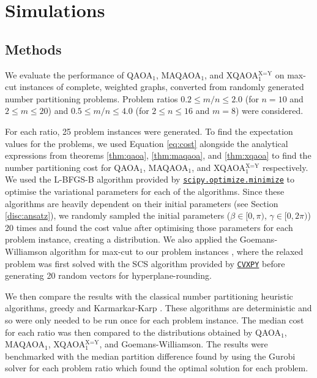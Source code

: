 \section{Simulations} \label{sec:sim}
\subsection{Methods}
We evaluate the performance of QAOA$_1$, MAQAOA$_1$, and XQAOA$_1^{\text{X=Y}}$ on max-cut instances of complete, weighted graphs, converted from randomly generated number partitioning problems. Problem ratios $0.2\leq m/n\leq 2.0$ (for $n=10$ and $2\leq m\leq 20$) and $0.5\leq m/n\leq 4.0$ (for $2\leq n\leq 16$ and $m=8$) were considered. 

For each ratio, 25 problem instances were generated. To find the expectation values for the problems, we used Equation \ref{eq:cost} alongside the analytical expressions from theorems \ref{thm:qaoa}, \ref{thm:maqaoa}, and \ref{thm:xqaoa} to find the number partitioning cost for QAOA$_1$, MAQAOA$_1$, and XQAOA$_1^{\text{X=Y}}$ respectively. We used the L-BFGS-B algorithm provided by \href{https://docs.scipy.org/doc/scipy/reference/optimize.minimize-lbfgsb.html}{\texttt{scipy.optimize.minimize}} to optimise the variational parameters for each of the algorithms. Since these algorithms are heavily dependent on their initial parameters (see Section \ref{disc:ansatz}), we randomly sampled the initial parameters ($\beta\in[0,\pi)$, $\gamma\in[0,2\pi)$) 20 times and found the cost value after optimising those parameters for each problem instance, creating a distribution. We also applied the Goemans-Williamson algorithm for max-cut to our problem instances \cite{goemans1994879}, where the relaxed problem was first solved with the SCS algorithm provided by \href{https://www.cvxpy.org/tutorial/advanced/index.html}{\texttt{CVXPY}} before generating 20 random vectors for hyperplane-rounding.

We then compare the results with the classical number partitioning heuristic algorithms, greedy and Karmarkar-Karp \cite{korf2009multi}. These algorithms are deterministic and so were only needed to be run once for each problem instance. The median cost for each ratio was then compared to the distributions obtained by QAOA$_1$, MAQAOA$_1$, XQAOA$_1^{\text{X=Y}}$, and Goemans-Williamson. The results were benchmarked with the median partition difference found by using the Gurobi solver \cite{gurobi} for each problem ratio which found the optimal solution for each problem.



